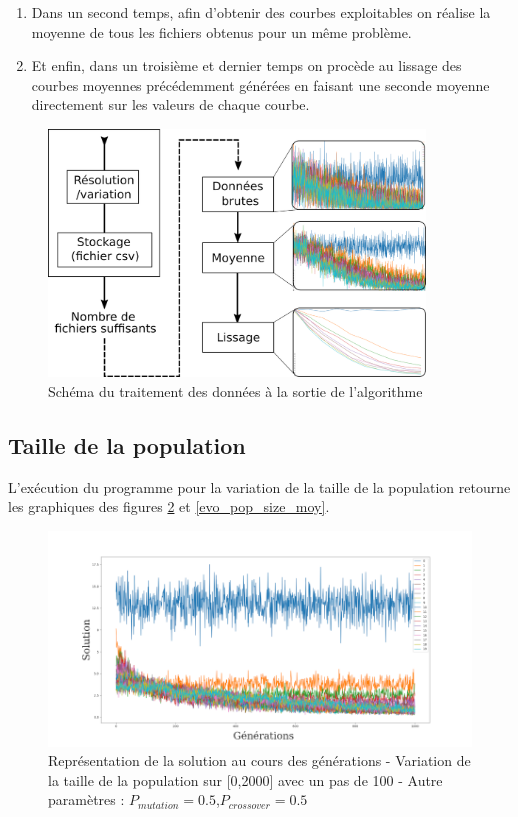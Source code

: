 \documentclass[12pt]{report}
\begin{document}
\begin{itemize}
\begin{enumerate}
          \item Dans un second temps, afin d'obtenir des courbes exploitables on réalise la moyenne de tous les fichiers obtenus pour un même problème.

          \item Et enfin, dans un troisième et dernier temps on procède au lissage des courbes moyennes précédemment générées en faisant une seconde moyenne directement sur les valeurs de chaque courbe.
        \end{enumerate}
        \end{itemize}
          \begin{figure}[!]
            \centering
            \includegraphics[width=10cm]{img/logigramme.png}
            \caption{Schéma du traitement des données à la sortie de l'algorithme}
            \label{logi}
          \end{figure}


      \subsection{Taille de la population}
        L'exécution du programme pour la variation de la taille de la population retourne les graphiques des figures \ref{evo_pop_size_brut} et \ref{evo_pop_size_moy}.

        \begin{figure}[h]
          \centering
          \includegraphics[width=18cm]{img/evo_pop_size_brut.png}
          \caption{Représentation de la solution au cours des générations - Variation de la taille de la population sur [0,2000] avec un pas de 100 - Autre paramètres : $P_{mutation} = 0.5$,$P_{crossover} = 0.5$}
          \label{evo_pop_size_brut}
        \end{figure}
\end{document}
